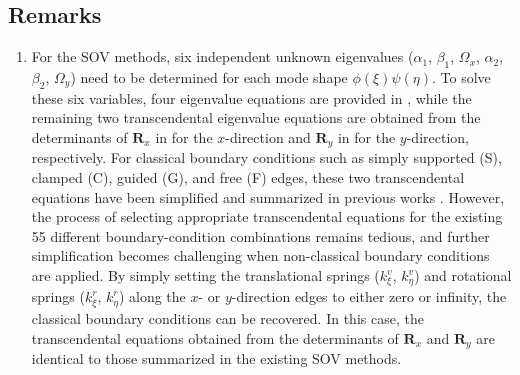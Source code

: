 \documentclass[preprint,12pt,number]{elsarticle}
\begin{document}
\subsection{Remarks}
\begin{enumerate}[label=(\roman*)]
	\item For the SOV methods, six independent unknown eigenvalues ($\alpha_1$, $\beta_1$, $\Omega_x$, $\alpha_2$, $\beta_2$, $\Omega_y$) need to be determined for each mode shape $\phi(\xi)\psi(\eta)$.  
	To solve these six variables, four eigenvalue equations are provided in , while the remaining two transcendental eigenvalue equations are obtained from the determinants of $\mathbf{R}_x$ in  for the $x$-direction and $\mathbf{R}_y$ in  for the $y$-direction, respectively.
	For classical boundary conditions such as simply supported (S), clamped (C), guided (G), and free (F) edges, these two transcendental equations have been simplified and summarized in previous works \citep{xing2020extended,xing2020improved,xing2022review}.  
	However, the process of selecting appropriate transcendental equations for the existing 55 different boundary-condition combinations remains tedious, and further simplification becomes challenging when non-classical boundary conditions are applied.
	By simply setting the translational springs ($k^{v}_{\xi}$, $k^{v}_{\eta}$) and rotational springs ($k^r_{\xi}$, $k^r_{\eta}$) along the $x$- or $y$-direction edges to either zero or infinity, the classical boundary conditions can be recovered.  
	In this case, the transcendental equations obtained from the determinants of $\mathbf{R}_x$ and $\mathbf{R}_y$ are identical to those summarized in the existing SOV methods.
	

\end{enumerate}
\end{document}
